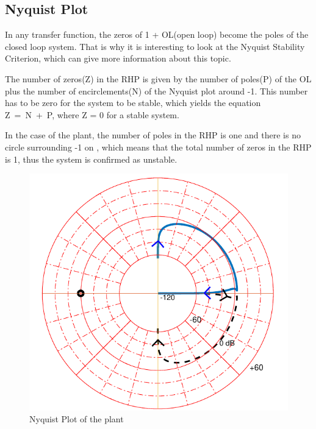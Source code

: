 \subsection{Nyquist Plot}
In any transfer function, the zeros of 1 + OL(open loop) become the poles of the closed loop system. That is why it is interesting to look at the Nyquist Stability Criterion, which can give more information about this topic.

The number of zeros(Z) in the RHP is given by the number of poles(P) of the OL plus the number of encirclements(N) of the Nyquist plot around -1. This number has to be zero for the system to be stable, which yields the equation \si{Z = N+P}, where Z = 0 for a stable system.

In the case of the plant, the number of poles in the RHP is one and there is no circle surrounding -1 on , which means that the total number of zeros in the RHP is 1, thus the system is confirmed as unstable.

\begin{figure}[H] 
	\centering 
	\includegraphics[scale=0.7]{figures/nyquistCubli}
	\centering
	\captionsetup{justification=centering}	
	\caption{Nyquist Plot of the plant}
	\label{nyquistCubli}
\end{figure}
